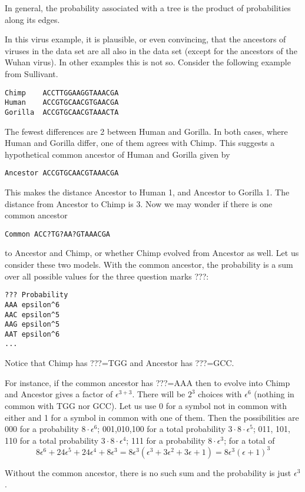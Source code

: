 In general, the probability associated with a tree is the product of probabilities along its edges.


In this virus example, it is plausible, or even convincing, that the ancestors of viruses in the data set are all also in the data set (except for the ancestors of the Wuhan virus).
In other examples this is not so.
Consider the following example from Sullivant.
\begin{verbatim}
Chimp    ACCTTGGAAGGTAAACGA
Human    ACCGTGCAACGTGAACGA
Gorilla  ACCGTGCAACGTAAACTA
\end{verbatim}
The fewest differences are 2 between Human and Gorilla.
In both cases, where Human and Gorilla differ, one of them agrees with Chimp.
This suggests a hypothetical common ancestor of Human and Gorilla given by
\begin{verbatim}
Ancestor ACCGTGCAACGTAAACGA
\end{verbatim}
This makes the distance Ancestor to Human 1, and Ancestor to Gorilla 1.
The distance from Ancestor to Chimp is 3.
Now we may wonder if there is one common ancestor
\begin{verbatim}
Common ACC?TG?AA?GTAAACGA
\end{verbatim}

to Ancestor and Chimp, or whether Chimp evolved from Ancestor as well.
Let us consider these two models.
With the common ancestor, the probability is a sum over all possible values for the three question marks ???:
\begin{verbatim}
??? Probability
AAA epsilon^6
AAC epsilon^5
AAG epsilon^5
AAT epsilon^6
...
\end{verbatim}
Notice that Chimp has ???=TGG and Ancestor has ???=GCC.

For instance, if the common ancestor has ???=AAA then to evolve into Chimp and Ancestor gives a factor of $\epsilon^{3+3}$.
There will be $2^3$ choices with $\epsilon^6$ (nothing in common with TGG nor GCC).
Let us use 0 for a symbol not in common with either and 1 for a symbol in common with one of them. Then the possibilities are
000 for a probability $8\cdot \epsilon^6$;
001,010,100 for a total probability $3\cdot 8\cdot \epsilon^5$;
011, 101, 110 for a total probability $3\cdot 8\cdot \epsilon^4$;
111 for a probability $8\cdot \epsilon^3$;
for a total of
\[
	8 \epsilon^6 + 24 \epsilon^5 + 24 \epsilon^4 + 8\epsilon^3 = 8\epsilon^3(\epsilon^3+3\epsilon^2+3\epsilon+1)=8\epsilon^3(\epsilon+1)^3
\]


Without the common ancestor, there is no such sum and the probability is just $\epsilon^{3}$.

